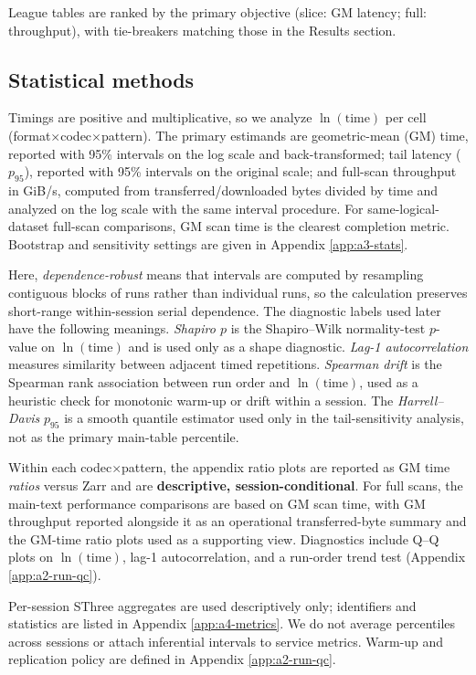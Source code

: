 \documentclass[nomenclature, english, bibtex]{kththesis}
\numberwithin{listing}{chapter}
\begin{document}
League tables are ranked by the primary objective (slice: \gls{GM} latency; full: throughput), with tie-breakers matching those in the Results section.

\subsection{Statistical methods}
Timings are positive and multiplicative, so we analyze $\ln(\text{time})$ per cell (format$\times$codec$\times$pattern). The primary estimands are geometric-mean (\gls{GM}) time, reported with 95\% intervals on the log scale and back-transformed; tail latency ($p_{95}$), reported with 95\% intervals on the original scale; and full-scan throughput in GiB/s, computed from transferred/downloaded bytes divided by time and analyzed on the log scale with the same interval procedure. For same-logical-dataset full-scan comparisons, \gls{GM} scan time is the clearest completion metric. Bootstrap and sensitivity settings are given in Appendix \ref{app:a3-stats}.

Here, \emph{dependence-robust} means that intervals are computed by resampling contiguous blocks of runs rather than individual runs, so the calculation preserves short-range within-session serial dependence. The diagnostic labels used later have the following meanings. \emph{Shapiro $p$} is the Shapiro--Wilk normality-test $p$-value on $\ln(\text{time})$ and is used only as a shape diagnostic. \emph{Lag-1 autocorrelation} measures similarity between adjacent timed repetitions. \emph{Spearman drift} is the Spearman rank association between run order and $\ln(\text{time})$, used as a heuristic check for monotonic warm-up or drift within a session. The \emph{Harrell--Davis} $p_{95}$ is a smooth quantile estimator used only in the tail-sensitivity analysis, not as the primary main-table percentile.

Within each codec$\times$pattern, the appendix ratio plots are reported as \gls{GM} time \emph{ratios} versus Zarr and are \textbf{descriptive, session-conditional}. For full scans, the main-text performance comparisons are based on \gls{GM} scan time, with \gls{GM} throughput reported alongside it as an operational transferred-byte summary and the \gls{GM}-time ratio plots used as a supporting view. Diagnostics include Q--Q plots on $\ln(\text{time})$, lag-1 autocorrelation, and a run-order trend test (Appendix \ref{app:a2-run-qc}).

Per-session \gls{SThree} aggregates are used descriptively only; identifiers and statistics are listed in Appendix \ref{app:a4-metrics}. We do not average percentiles across sessions or attach inferential intervals to service metrics. Warm-up and replication policy are defined in Appendix \ref{app:a2-run-qc}.
\end{document}
